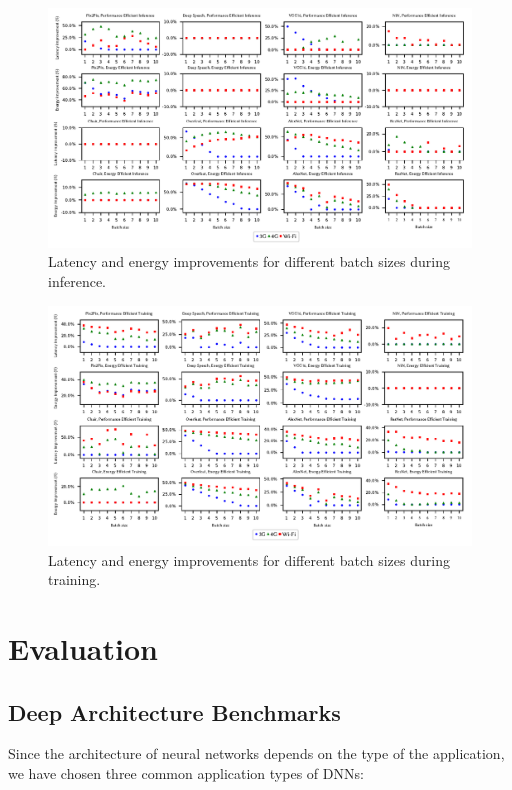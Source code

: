 \begin{figure}
\includegraphics{inference_results}
\caption{Latency and energy improvements for different batch sizes during inference.}
\label{inference_results}
\end{figure}

\begin{figure}
\includegraphics[width=\linewidth]{training_results}
\caption{Latency and energy improvements for different batch sizes during training.}
\label{training_results}
\end{figure}

\section{Evaluation}

\subsection{Deep Architecture Benchmarks}

Since the architecture of neural networks depends on the type of the application, we have chosen three common application types of DNNs:

